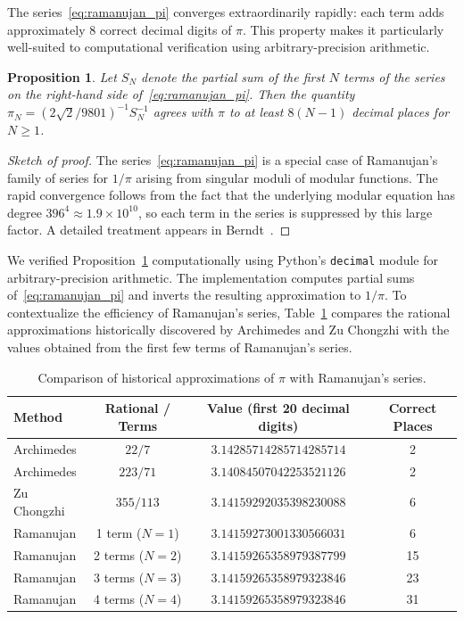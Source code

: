 \documentclass[10pt]{amsart}
\theoremstyle{plain}
\newtheorem{proposition}[theorem]{Proposition}
\theoremstyle{definition}
\theoremstyle{remark}
\begin{document}
The series~\eqref{eq:ramanujan_pi} converges extraordinarily rapidly:
each term adds approximately $8$ correct decimal digits of $\pi$. This
property makes it particularly well-suited to computational
verification using arbitrary-precision arithmetic.

\begin{proposition}
\label{prop:pi_convergence}
Let $S_N$ denote the partial sum of the first $N$ terms of the series
on the right-hand side of~\eqref{eq:ramanujan_pi}. Then the quantity
$\pi_N = (2\sqrt{2}/9801)^{-1} S_N^{-1}$ agrees with $\pi$ to at
least $8(N-1)$ decimal places for $N \geq 1$.
\end{proposition}

\begin{proof}[Sketch of proof]
The series~\eqref{eq:ramanujan_pi} is a special case of Ramanujan's
family of series for $1/\pi$ arising from singular moduli of modular
functions. The rapid convergence follows from the fact that the
underlying modular equation has degree $396^4 \approx 1.9 \times
10^{10}$, so each term in the series is suppressed by this large
factor. A detailed treatment appears in Berndt~\cite[Chapter~1]{berndt_1985}.
\end{proof}

We verified Proposition~\ref{prop:pi_convergence} computationally using
Python's \texttt{decimal} module for arbitrary-precision arithmetic.
The implementation computes partial sums of~\eqref{eq:ramanujan_pi}
and inverts the resulting approximation to $1/\pi$. To contextualize the
efficiency of Ramanujan's series, Table~\ref{tab:pi} compares the
rational approximations historically discovered by Archimedes and Zu Chongzhi
with the values obtained from the first few terms of Ramanujan's series.

\begin{table}
\small
\caption{Comparison of historical approximations of $\pi$ with Ramanujan's series.}
\label{tab:pi}
\begin{tabular}{lccc}
\toprule
Method & Rational / Terms & Value (first 20 decimal digits) & Correct Places \\
\midrule
Archimedes & $22/7$ & $3.14285714285714285714$ & 2 \\
Archimedes & $223/71$ & $3.14084507042253521126$ & 2 \\
Zu Chongzhi & $355/113$ & $3.14159292035398230088$ & 6 \\
Ramanujan & 1 term ($N=1$) & $3.14159273001330566031$ & 6 \\
Ramanujan & 2 terms ($N=2$) & $3.14159265358979387799$ & 15 \\
Ramanujan & 3 terms ($N=3$) & $3.14159265358979323846$ & 23 \\
Ramanujan & 4 terms ($N=4$) & $3.14159265358979323846$ & 31 \\
\bottomrule
\end{tabular}
\end{table}
\end{document}
